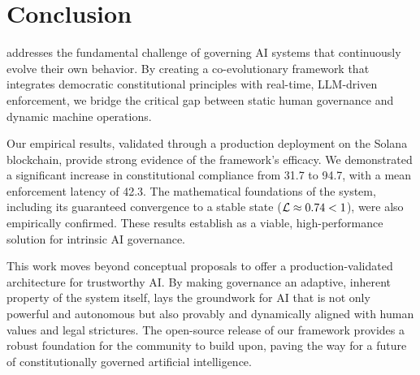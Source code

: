 \section{Conclusion}
\label{sec:conclusion}
\acgs{} addresses the fundamental challenge of governing AI systems that continuously evolve their own behavior. By creating a co-evolutionary framework that integrates democratic constitutional principles with real-time, LLM-driven enforcement, we bridge the critical gap between static human governance and dynamic machine operations.

Our empirical results, validated through a production deployment on the Solana blockchain, provide strong evidence of the framework's efficacy. We demonstrated a significant increase in constitutional compliance from 31.7\percent{} to 94.7\percent{}, with a mean enforcement latency of 42.3\ms{}. The mathematical foundations of the system, including its guaranteed convergence to a stable state ($\lipschitz \approx 0.74 < 1$), were also empirically confirmed. These results establish \acgs{} as a viable, high-performance solution for intrinsic AI governance.

This work moves beyond conceptual proposals to offer a production-validated architecture for trustworthy AI\@. By making governance an adaptive, inherent property of the system itself, \acgs{} lays the groundwork for AI that is not only powerful and autonomous but also provably and dynamically aligned with human values and legal strictures. The open-source release of our framework provides a robust foundation for the community to build upon, paving the way for a future of constitutionally governed artificial intelligence.
